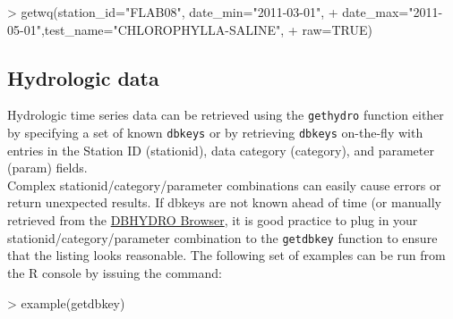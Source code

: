 \documentclass[12pt,notitlepage]{article}
\begin{document}
\begin{Schunk}
\begin{Sinput}
> getwq(station_id="FLAB08", date_min="2011-03-01",
+             date_max="2011-05-01",test_name="CHLOROPHYLLA-SALINE",
+             raw=TRUE)
\end{Sinput}
\end{Schunk}

\subsection{Hydrologic data}

Hydrologic time series data can be retrieved using the \texttt{gethydro} function either by specifying a set of known \texttt{dbkeys} or by retrieving \texttt{dbkeys} on-the-fly with entries in the Station ID (stationid), data category (category), and parameter (param) fields.\\

Complex stationid/category/parameter combinations can easily cause errors or return unexpected results. If dbkeys are not known ahead of time (or manually retrieved from the \href{http://my.sfwmd.gov/dbhydroplsql/show_dbkey_info.main_menu}{DBHYDRO Browser}, it is good practice to plug in your stationid/category/parameter combination to the \texttt{getdbkey} function to ensure that the listing looks reasonable. The following set of examples can be run from the R console by issuing the command:

\begin{Schunk}
\begin{Sinput}
> example(getdbkey)
\end{Sinput}
\end{Schunk}
\end{document}

